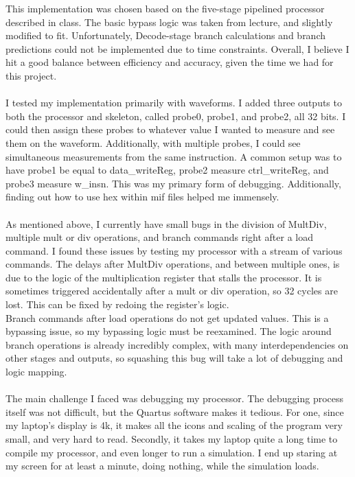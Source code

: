 \documentclass[letterpaper]{article} %
\begin{document}
This implementation was chosen based on the five-stage pipelined processor described in class. The basic bypass logic was taken from lecture, and slightly modified to fit. Unfortunately, Decode-stage branch calculations and branch predictions could not be implemented due to time constraints. Overall, I believe I hit a good balance between efficiency and accuracy, given the time we had for this project. \\ \\
I tested my implementation primarily with waveforms. I added three outputs to both the processor and skeleton, called probe0, probe1, and probe2, all 32 bits. I could then assign these probes to whatever value I wanted to measure and see them on the waveform. Additionally, with multiple probes, I could see simultaneous measurements from the same instruction. A common setup was to have probe1 be equal to data\_writeReg, probe2 measure ctrl\_writeReg, and probe3 measure w\_insn. This was my primary form of debugging. Additionally, finding out how to use hex within mif files helped me immensely. \\ \\
As mentioned above, I currently have small bugs in the division of MultDiv, multiple mult or div operations, and branch commands right after a load command. I found these issues by testing my processor with a stream of various commands. The delays after MultDiv operations, and between multiple ones, is due to the logic of the multiplication register that stalls the processor. It is sometimes triggered accidentally after a mult or div operation, so 32 cycles are lost. This can be fixed by redoing the register's logic. \\
Branch commands after load operations do not get updated values. This is a bypassing issue, so my bypassing logic must be reexamined. The logic around branch operations is already incredibly complex, with many interdependencies on other stages and outputs, so squashing this bug will take a lot of debugging and logic mapping. \\ \\
The main challenge I faced was debugging my processor. The debugging process itself was not difficult, but the Quartus software makes it tedious. For one, since my laptop's display is 4k, it makes all the icons and scaling of the program very small, and very hard to read. Secondly, it takes my laptop quite a long time to compile my processor, and even longer to run a simulation. I end up staring at my screen for at least a minute, doing nothing, while the simulation loads. \\
\end{document}
